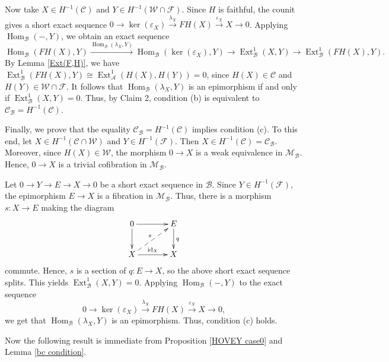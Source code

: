 \documentclass[12pt,twoside]{amsart}
\theoremstyle{bfupright head,slanted body}
\theoremstyle{bfupright head,upright body}
\theoremstyle{fixed bf head,slanted body}
\theoremstyle{fixed bf head,upright body}
\theoremstyle{numbered paragraph}
\newenvironment{prf*}[1][Proof]{%
  \begin{proof}[\bf #1]
    \setcounter{equation}{0}
    \renewcommand{\theequation}{\arabic{equation}}}
  {\end{proof}
}
\numberwithin{equation}{res}
\newcommand{\calC}{\mathcal{C}}
\newcommand{\calB}{\mathcal{B}}
\newcommand{\calM}{\mathcal{M}}
\newcommand{\id}{\mathrm{id}}
\newcommand{\Hom}{\operatorname{Hom}}
\newcommand{\Ext}{\operatorname{Ext}}
\begin{document}
\begin{prf*}
Now take \(X\in H^{-1}(\mathcal C)\) and \(Y\in H^{-1}(\mathcal W\cap\mathcal F)\).
Since \(H\) is faithful, the counit gives a short exact sequence
\(0\to \ker(\varepsilon_X) \xrightarrow{\lambda_X} FH(X) \xrightarrow{\varepsilon_X} X\to 0\).
Applying \(\Hom_{\mathcal B}(-,Y)\), we obtain an exact sequence
\[
\Hom_{\mathcal B}(FH(X),Y)
\xrightarrow{\Hom_{\mathcal B}(\lambda_X,Y)}
\Hom_{\mathcal B}(\ker(\varepsilon_X),Y)
\to
\Ext^1_{\mathcal B}(X,Y)
\to
\Ext^1_{\mathcal B}(FH(X),Y).
\]
By Lemma \ref{Ext(F,H)}, we have
\(\Ext^1_{\mathcal B}(FH(X),Y) \cong \Ext^1_{\mathcal A}(H(X),H(Y))=0\),
since \(H(X)\in\mathcal C\) and \(H(Y)\in\mathcal W\cap\mathcal F\).
It follows that \(\Hom_{\mathcal B}(\lambda_X,Y)\) is an epimorphism if and only if
\(\Ext^1_{\mathcal B}(X,Y)=0\).
Thus, by Claim 2, condition (b) is equivalent to \(\calC_{\calB}=H^{-1}(\mathcal C)\).

Finally, we prove that the equality \(\calC_{\calB}=H^{-1}(\mathcal C)\) implies condition (c). To this end, let
\(X\in H^{-1}(\mathcal C\cap\mathcal W)\) and \(Y\in H^{-1}(\mathcal F)\).
Then \(X\in H^{-1}(\mathcal C)=\calC_{\calB}\).
Moreover, since \(H(X)\in\mathcal W\), the morphism \(0\to X\) is a weak equivalence in \(\calM_\calB\). Hence, \(0\to X\) is a trivial cofibration in \(\calM_\calB\).

Let \(0\to Y\to E\to X\to 0\) be a short exact sequence in \(\calB\).
Since \(Y\in H^{-1}(\mathcal F)\), the epimorphism \(E\to X\) is a fibration in \(\calM_\calB\). Thus, there is a morphism \(s:X\to E\) making the diagram
\[
\xymatrix@C=1.25cm{
  0
\ar[r]
\ar[d]
& E
\ar[d]^{q} \\
  X
\ar[r]^-{\id_X}
\ar@{-->}[ur]^{s}
& X
}
\]
commute. Hence, \(s\) is a section of \(q:E\to X\), so the above short exact sequence splits. This yields \(\Ext^1_{\mathcal B}(X,Y)=0\).
Applying \(\Hom_{\mathcal B}(-,Y)\) to the exact sequence
$$0\to \ker(\varepsilon_X) \xrightarrow{\lambda_X} FH(X) \xrightarrow{\varepsilon_X} X\to 0,$$
we get that \(\Hom_{\mathcal B}(\lambda_X,Y)\) is an epimorphism. Thus, condition (c) holds.
\end{prf*}

Now the following result is immediate from Proposition \ref{HOVEY case0} and Lemma \ref{bc condition}.
\end{document}
